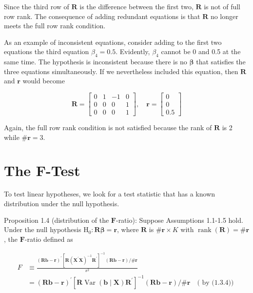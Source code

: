 \documentclass[10pt]{article}
\begin{document}
Since the third row of $\mathbf{R}$ is the difference between the first two, $\mathbf{R}$ is not of full row rank. The consequence of adding redundant equations is that $\mathbf{R}$ no longer meets the full row rank condition.

As an example of inconsistent equations, consider adding to the first two equations the third equation $\beta_{4}=0.5$. Evidently, $\beta_{4}$ cannot be 0 and 0.5 at the same time. The hypothesis is inconsistent because there is no $\boldsymbol{\beta}$ that satisfies the three equations simultaneously. If we nevertheless included this equation, then $\mathbf{R}$ and $\mathbf{r}$ would become

$$
\mathbf{R}=\left[\begin{array}{cccc}
0 & 1 & -1 & 0 \\
0 & 0 & 0 & 1 \\
0 & 0 & 0 & 1
\end{array}\right], \quad \mathbf{r}=\left[\begin{array}{c}
0 \\
0 \\
0.5
\end{array}\right]
$$

Again, the full row rank condition is not satisfied because the rank of $\mathbf{R}$ is 2 while $\# \mathbf{r}=3$.

\section*{The $\boldsymbol{F}$-Test}
To test linear hypotheses, we look for a test statistic that has a known distribution under the null hypothesis.

Proposition 1.4 (distribution of the $\boldsymbol{F}$-ratio): Suppose Assumptions 1.1-1.5 hold. Under the null hypothesis $\mathrm{H}_{0}: \mathbf{R} \boldsymbol{\beta}=\mathbf{r}$, where $\mathbf{R}$ is $\# \mathbf{r} \times K$ with $\operatorname{rank}(\mathbf{R})= \# \mathbf{r}$, the $\boldsymbol{F}$-ratio defined as


\begin{align*}
F & \equiv \frac{(\mathbf{R} \mathbf{b}-\mathbf{r})^{\prime}\left[\mathbf{R}\left(\mathbf{X}^{\prime} \mathbf{X}\right)^{-1} \mathbf{R}^{\prime}\right]^{-1}(\mathbf{R} \mathbf{b}-\mathbf{r}) / \# \mathbf{r}}{s^{2}} \\
& =(\mathbf{R} \mathbf{b}-\mathbf{r})^{\prime}\left[\mathbf{R} \operatorname{Var}(\mathbf{b} \mid \mathbf{X}) \mathbf{R}^{\prime}\right]^{-1}(\mathbf{R} \mathbf{b}-\mathbf{r}) / \# \mathbf{r} \quad(\text { by (1.3.4)) } \tag{1.4.9}
\end{align*}
\end{document}
